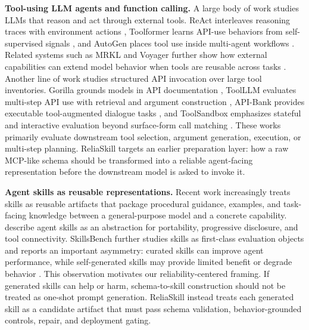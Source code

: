 \documentclass[11pt]{article}
\newcommand{\method}{ReliaSkill}
\begin{document}
\textbf{Tool-using LLM agents and function calling.}
A large body of work studies LLMs that reason and act through external tools. ReAct interleaves reasoning traces with environment actions \citep{yao2023react}, Toolformer learns API-use behaviors from self-supervised signals \citep{schick2023toolformer}, and AutoGen places tool use inside multi-agent workflows \citep{wu2023autogen}. Related systems such as MRKL and Voyager further show how external capabilities can extend model behavior when tools are reusable across tasks \citep{karpas2022mrkl,wang2023voyager}. Another line of work studies structured API invocation over large tool inventories. Gorilla grounds models in API documentation \citep{patil2024gorilla}, ToolLLM evaluates multi-step API use with retrieval and argument construction \citep{qin2024toolllm}, API-Bank provides executable tool-augmented dialogue tasks \citep{li2023apibank}, and ToolSandbox emphasizes stateful and interactive evaluation beyond surface-form call matching \citep{lu2025toolsandbox}. These works primarily evaluate downstream tool selection, argument generation, execution, or multi-step planning. \method{} targets an earlier preparation layer: how a raw MCP-like schema should be transformed into a reliable agent-facing representation before the downstream model is asked to invoke it.

\textbf{Agent skills as reusable representations.}
Recent work increasingly treats skills as reusable artifacts that package procedural guidance, examples, and task-facing knowledge between a general-purpose model and a concrete capability. \citet{xu2026agentskillslargelanguage} describe agent skills as an abstraction for portability, progressive disclosure, and tool connectivity. SkillsBench further studies skills as first-class evaluation objects and reports an important asymmetry: curated skills can improve agent performance, while self-generated skills may provide limited benefit or degrade behavior \citep{li2026skillsbenchbenchmarkingagentskills}. This observation motivates our reliability-centered framing. If generated skills can help or harm, schema-to-skill construction should not be treated as one-shot prompt generation. \method{} instead treats each generated skill as a candidate artifact that must pass schema validation, behavior-grounded controls, repair, and deployment gating.
\end{document}
